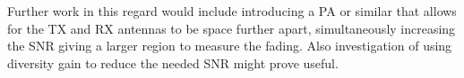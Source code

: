 Further work in this regard would include introducing a PA or similar that allows for the TX and RX antennas to be space further apart, simultaneously increasing the SNR giving a larger region to measure the fading. Also investigation of using diversity gain to reduce the needed SNR might prove useful.




